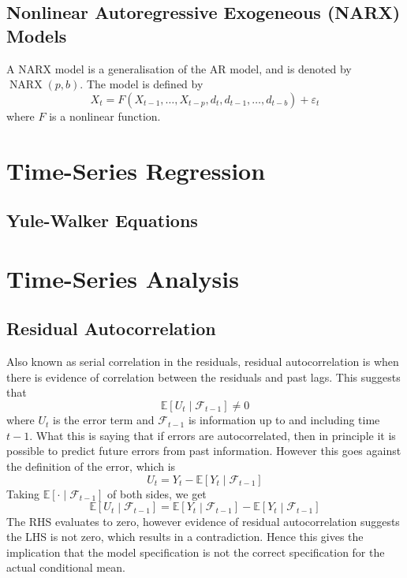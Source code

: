 \documentclass[11pt]{report} %
\begin{document}
\subsection{Nonlinear Autoregressive Exogeneous (NARX) Models}
A NARX model is a generalisation of the AR model, and is denoted by $\operatorname{NARX}\left(p, b\right)$. The model is defined by
\begin{equation}
X_{t} = F\left(X_{t - 1}, \dots, X_{t - p}, d_{t}, d_{t - 1}, \dots, d_{t - b}\right) + \varepsilon_{t}
\end{equation}
where $F$ is a nonlinear function.

\section{Time-Series Regression}

\subsection{Yule-Walker Equations}

\section{Time-Series Analysis}

\subsection{Residual Autocorrelation}

Also known as serial correlation in the residuals, residual autocorrelation is when there is evidence of correlation between the residuals and past lags. This suggests that
\begin{equation}
\mathbb{E}\left[U_{t}\middle|\mathcal{F}_{t - 1}\right] \neq 0
\end{equation}
where $U_{t}$ is the error term and $\mathcal{F}_{t - 1}$ is information up to and including time $t - 1$. What this is saying that if errors are autocorrelated, then in principle it is possible to predict future errors from past information. However this goes against the definition of the error, which is
\begin{equation}
U_{t} = Y_{t} - \mathbb{E}\left[Y_{t}\middle|\mathcal{F}_{t - 1}\right]
\end{equation}
Taking $\mathbb{E}\left[\cdot\middle|\mathcal{F}_{t - 1}\right]$ of both sides, we get
\begin{equation}
\mathbb{E}\left[U_{t}\middle|\mathcal{F}_{t - 1}\right] = \mathbb{E}\left[Y_{t}\middle|\mathcal{F}_{t - 1}\right] - \mathbb{E}\left[Y_{t}\middle|\mathcal{F}_{t - 1}\right]
\end{equation}
The RHS evaluates to zero, however evidence of residual autocorrelation suggests the LHS is not zero, which results in a contradiction. Hence this gives the implication that the model specification is not the correct specification for the actual conditional mean.
\end{document}
